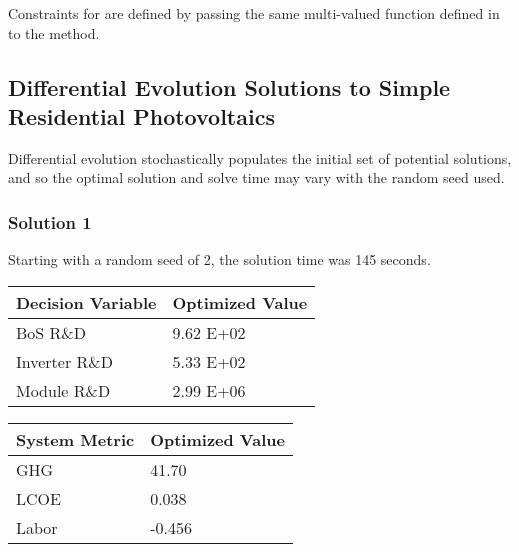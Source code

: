 \documentclass[letterpaper,10pt,english]{sphinxmanual}
\begin{document}
Constraints for  are defined by passing the same multi-valued function defined in  to the  method.


\subsection{Differential Evolution Solutions to Simple Residential Photovoltaics}
\label{\detokenize{optimizers:differential-evolution-solutions-to-simple-residential-photovoltaics}}
Differential evolution stochastically populates the initial set of potential solutions, and so the optimal solution and solve time may vary with the random seed used.


\subsubsection{Solution 1}
\label{\detokenize{optimizers:solution-1}}
Starting with a random seed of 2, the solution time was 145 seconds.


\begin{savenotes}\sphinxattablestart
\centering
{}
\sphinxthecaptionisattop
{}\label{\detokenize{optimizers:table-4}}\label{\detokenize{optimizers:tbl-diffevvars1}}
\sphinxaftertopcaption
\begin{tabulary}{\linewidth}[t]{|T|T|}
\hline
\sphinxstyletheadfamily 
Decision Variable
&\sphinxstyletheadfamily 
Optimized Value
\\
\hline
BoS R\&D
&
9.62 E+02
\\
\hline
Inverter R\&D
&
5.33 E+02
\\
\hline
Module R\&D
&
2.99 E+06
\\
\hline
\end{tabulary}
\par
\sphinxattableend\end{savenotes}


\begin{savenotes}\sphinxattablestart
\centering
{}
\sphinxthecaptionisattop
{}\label{\detokenize{optimizers:table-5}}\label{\detokenize{optimizers:tbl-diffevmetrics1}}
\sphinxaftertopcaption
\begin{tabulary}{\linewidth}[t]{|T|T|}
\hline
\sphinxstyletheadfamily 
System Metric
&\sphinxstyletheadfamily 
Optimized Value
\\
\hline
GHG
&
41.70
\\
\hline
LCOE
&
0.038
\\
\hline
Labor
&
-0.456
\\
\hline
\end{tabulary}
\par
\sphinxattableend\end{savenotes}
\end{document}
